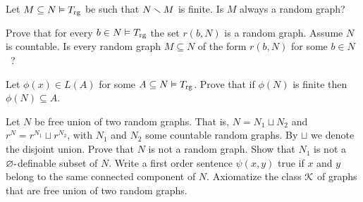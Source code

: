 \documentclass[creche.tex]{subfiles}
\begin{document}
\begin{exercise}
Let $M\subseteq N\models T_{\rm rg}$ be such that $N\sm M$ is finite. Is $M$ always a random graph?\QED
\end{exercise}

\begin{exercise}
Prove that for every $b\in N\models T_{\rm rg}$ the set $r(b,N)$ is a random graph. Assume $N$ is countable. Is every random  graph $M\subseteq N$ of the form $r(b,N)$ for some $b\in N$~?\QED
\end{exercise}


\begin{exercise}\label{ex_grafo_aleatorio_no_finiti_definibili} Let $\phi(x)\in L(A)$ for some $A\subseteq N\models T_{\rm rg}$. Prove that if $\phi(N)$ is finite then $\phi(N)\subseteq A$.\QED
\end{exercise}

\begin{exercise}\label{unionedisgiunta}
Let $N$ be free union of two random graphs. That is, $N=N_1\sqcup N_2$ and $r^N= r^{N_1}\sqcup r^{N_2}$, with $N_1$ and $N_2$ some countable random graphs. By $\sqcup$ we denote the disjoint union. Prove that $N$ is not a random graph. Show that $N_1$ is not a $\0\jj$definable subset of $N$. Write a first order sentence $\psi(x,y)$ true if $x$ and $y$ belong to the same connected component of $N$. Axiomatize the class $\K$ of graphs that are free union of two random graphs.\QED
\end{exercise}

% 
% 
\end{document}
